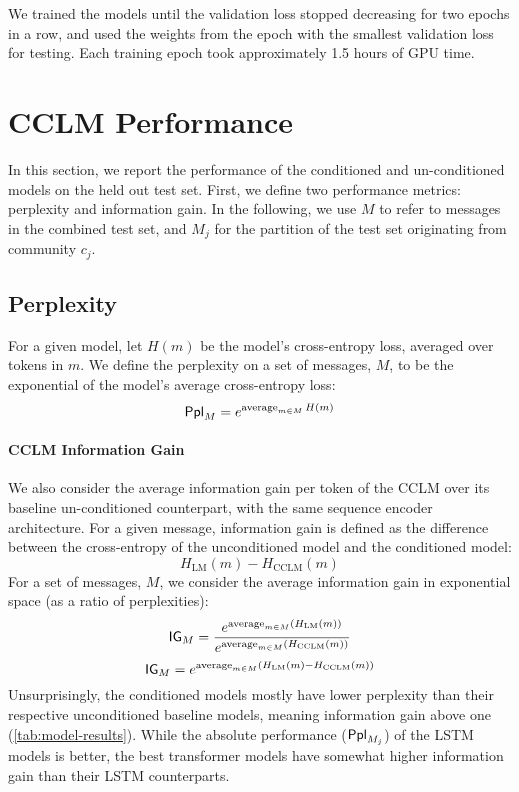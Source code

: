 \documentclass[11pt]{article}
\begin{document}
We trained the models until the validation loss stopped decreasing for
two epochs in a row, and used the weights from the epoch with the
smallest validation loss for testing. 
Each training epoch took approximately 1.5 hours of GPU time.


\section{CCLM Performance}

In this section, we report the performance of the conditioned and un-conditioned
models on the held out test set.
First, we define two performance metrics: perplexity and information gain.
In the following, we use $M$ to refer to messages in the
combined test set, and $M_j$ for the partition of the test set originating from 
community $c_j$.

\subsection{Perplexity}\label{sec:ppl}

For a given model, let $H(m)$ be the model's cross-entropy loss,
averaged over tokens in $m$.
We define the perplexity on a set of messages, $M$,
to be the exponential of the model's average cross-entropy loss:
\[\mathsf{Ppl}_M = e^{\operatorname*{average}_{m\in M} H(m)}\]

\paragraph{CCLM Information Gain}\label{sec:ig}

We also consider the average information gain per token of the CCLM over its baseline
un-conditioned counterpart, with the same sequence encoder architecture.
For a given message, information gain is defined as the difference
between the cross-entropy of the unconditioned model and the conditioned model:
\[H_{\mathrm{LM}}(m) - H_{\mathrm{CCLM}}(m)\]
For a set of messages, $M$, we consider the average information gain
in exponential space (as a ratio of perplexities):
\[\mathsf{IG}_M = \frac{e^{\operatorname*{average}_{m \in M}(H_{\mathrm{LM}}(m))}}{e^{\operatorname*{average}_{m \in M}(H_{\mathrm{CCLM}}(m))}}\]
\[\mathsf{IG}_M = {e^{\operatorname*{average}_{m \in M}(H_{\mathrm{LM}}(m) - H_{\mathrm{CCLM}}(m))}}\]
%
Unsurprisingly, the conditioned models mostly have lower perplexity 
than their respective unconditioned baseline models, 
meaning information gain above one (\cref{tab:model-results}).
While the absolute performance ($\mathsf{Ppl}_{M_j}$) of the LSTM models is better,
the best transformer models have somewhat higher information gain
than their LSTM counterparts.
\end{document}

